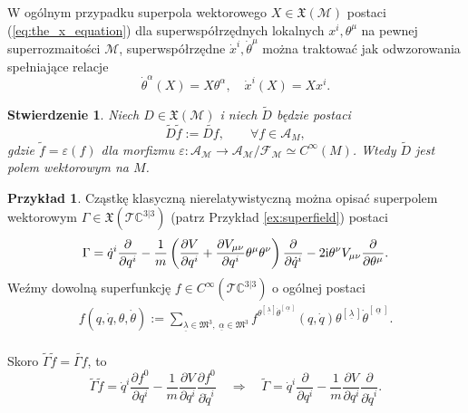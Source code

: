 \documentclass[11pt,a4paper]{report}
\newtheorem{proposition}[theorem]{Stwierdzenie}
\theoremstyle{definition}
\newtheorem{example}[theorem]{Przykład}
\begin{document}
W ogólnym przypadku superpola wektorowego $X \in \mathfrak{X}(\mathcal{M})$ postaci (\ref{eq:the_x_equation}) dla superwspółrzędnych lokalnych $x^i, \theta^\mu$ na pewnej superrozmaitości $\mathcal{M}$, superwspółrzędne $\dot x^i, \dot \theta^\mu$ można traktować jak odwzorowania spełniające relacje
\begin{equation*}
	\dot \theta^\alpha(X)=X\theta^\alpha,\quad \dot x^i(X)=X x^i.
\end{equation*}
		      			
\begin{proposition}
	Niech $D \in \mathfrak{X}(\mathcal{M})$ i niech $\widetilde{D}$ będzie postaci
	\begin{equation*}
		\widetilde{D}\widetilde{f}:=\widetilde{Df},\qquad \forall f\in \mathcal{A}_M,
	\end{equation*}
	gdzie $\widetilde f=\varepsilon(f)$ dla morfizmu $\varepsilon:\mathcal{A}_\mathcal{M} \rightarrow \mathcal{A}_\mathcal{M}/\mathcal{F}_\mathcal{M}\simeq C^\infty(M)$. Wtedy $\widetilde{D}$ jest polem wektorowym na $M$. \cite{monterde}
\end{proposition}
		      			
\begin{example}
	Cząstkę klasyczną nierelatywistyczną można opisać superpolem wektorowym $\Gamma \in \mathfrak{X}(\mathcal{T} \mathbb{C}^{3|3})$ (patrz Przykład \ref{ex:superfield}) postaci
	\begin{equation*}
		\Gamma = \dot q^i \frac{\partial}{\partial q^i} 
		- \frac{1}{m} \left( \frac{\partial V}{\partial q^i} + \frac{\partial V_{\mu \nu}}{\partial q^i} \theta^\mu \theta^\nu \right) \frac{\partial}{\partial \dot q^i} 
		- 2{\rm i} \theta^\nu V_{\mu \nu} \frac{\partial}{\partial \theta^\mu}.
	\end{equation*}
	Weźmy dowolną superfunkcję $f \in C^\infty(\mathcal{\mathcal{T}} \mathbb{C}^{3|3})$ o ogólnej postaci \\[-7pt]
	\begin{equation*}
		\begin{gathered}
			f(q,\dot q, \theta, \dot \theta) := \!\!\!\!\!\!\!\!
			\sum_{\underline{\lambda} \in \mathfrak{M}^3,\; \underline{\alpha} \in \mathfrak{M}^3} \!\!\!\!\!\!\!\! f^{\theta^{\left[\, \underline{\lambda}\, \right]} \dot \theta^{\left[\, \underline{\alpha}\, \right]}} (q, \dot q) \theta^{\left[\, \underline{\lambda}\, \right]} \dot \theta^{\left[\, \underline{\alpha}\, \right]}.
		\end{gathered}
	\end{equation*}\\[-13pt]
	Skoro $\widetilde \Gamma \widetilde f = \widetilde{\Gamma f}$, to\\[-7pt]
	\begin{equation*}
		\widetilde \Gamma \widetilde f = \dot q^i\frac{\partial f^0}{\partial q^i}
		-\frac1m \frac{\partial V}{\partial q^i}\frac{\partial f^0}{\partial \dot q^i} \quad 
		\Longrightarrow \quad \widetilde \Gamma = \dot q^i\frac{\partial}{\partial q^i} - \frac1m \frac{\partial V}{\partial q^i}\frac{\partial}{\partial \dot q^i}.
	\end{equation*}
\end{example}
		      			
\end{document}
